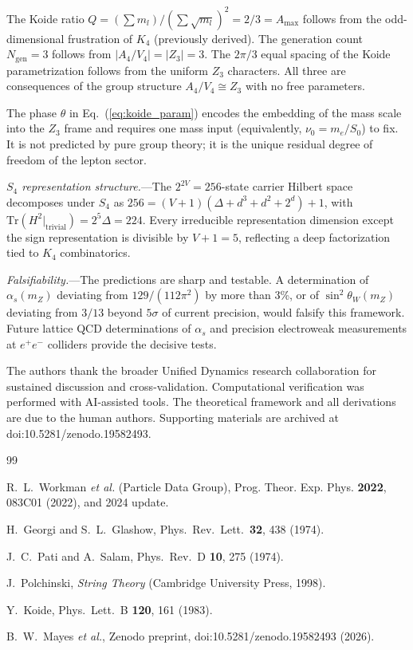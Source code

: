 \documentclass[aip,graphicx]{revtex4-1}
\begin{document}
The Koide ratio $Q = (\sum m_l)/(\sum\sqrt{m_l})^2 = 2/3 = A_{\max}$
follows from the odd-dimensional frustration of $K_4$ (previously
derived\cite{mayes2026}). The generation count $N_{\mathrm{gen}} = 3$
follows from $|A_4/V_4| = |Z_3| = 3$. The $2\pi/3$ equal spacing of
the Koide parametrization follows from the uniform $Z_3$ characters.
All three are consequences of the group structure $A_4/V_4 \cong Z_3$
with no free parameters.

The phase $\theta$ in Eq.~(\ref{eq:koide_param}) encodes the
embedding of the mass scale into the $Z_3$ frame and requires one
mass input (equivalently, $\nu_0 = m_e/S_0$) to fix. It is not
predicted by pure group theory; it is the unique residual degree of
freedom of the lepton sector.

\textit{$S_4$ representation structure.}---The $2^{2V} = 256$-state
carrier Hilbert space decomposes under $S_4$ as
$256 = (V+1)(\Delta + d^3 + d^2 + 2^d) + 1$,
with $\mathrm{Tr}(H^2|_{\mathrm{trivial}}) = 2^5\Delta = 224$.
Every irreducible representation dimension except the sign
representation is divisible by $V + 1 = 5$, reflecting a deep
factorization tied to $K_4$ combinatorics.

\textit{Falsifiability.}---The predictions are sharp and testable.
A determination of $\alpha_s(m_Z)$ deviating from $129/(112\pi^2)$
by more than 3\%, or of $\sin^2\theta_W(m_Z)$ deviating from $3/13$
beyond $5\sigma$ of current precision, would falsify this framework.
Future lattice QCD determinations of $\alpha_s$ and precision
electroweak measurements at $e^+e^-$ colliders provide the
decisive tests.


\begin{acknowledgments}
The authors thank the broader Unified Dynamics research
collaboration for sustained discussion and cross-validation.
Computational verification was performed with AI-assisted tools.
The theoretical framework and all derivations are due to the human authors.
Supporting materials are archived at \mbox{doi:10.5281/zenodo.19582493}.
\end{acknowledgments}


\begin{thebibliography}{99}

R.~L.~Workman \textit{et al.} (Particle Data Group),
Prog. Theor. Exp. Phys. \textbf{2022}, 083C01 (2022), and 2024
update.

H.~Georgi and S.~L.~Glashow,
Phys.\ Rev.\ Lett.\ \textbf{32}, 438 (1974).

J.~C.~Pati and A.~Salam,
Phys.\ Rev.\ D \textbf{10}, 275 (1974).

J.~Polchinski,
\textit{String Theory} (Cambridge University Press, 1998).

Y.~Koide,
Phys.\ Lett.\ B \textbf{120}, 161 (1983).

B.~W.~Mayes \textit{et al.},
Zenodo preprint, doi:10.5281/zenodo.19582493 (2026).

\end{thebibliography}
\end{document}
